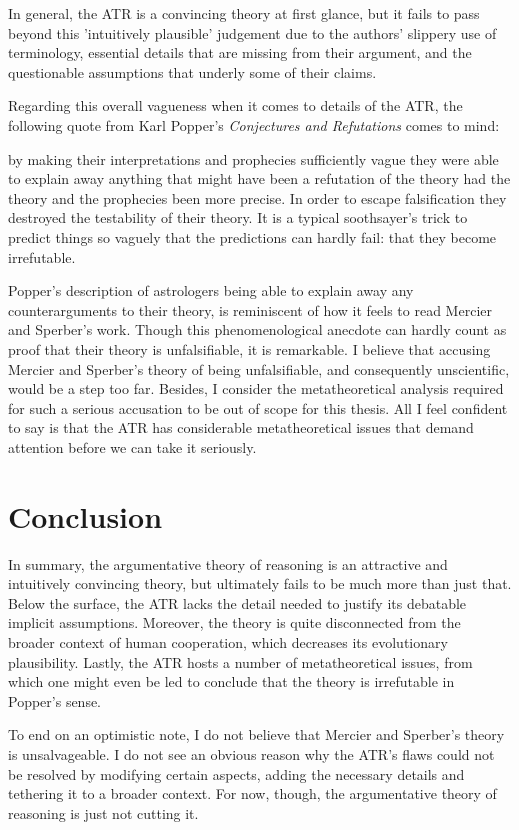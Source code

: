 In general, the ATR is a convincing theory at first glance, but it fails to pass beyond this 'intuitively plausible' judgement due to the authors' slippery use of terminology, essential details that are missing from their argument, and the questionable assumptions that underly some of their claims.

Regarding this overall vagueness when it comes to details of the ATR, the following quote from Karl Popper's \emph{Conjectures and Refutations} comes to mind:
\begin{quoting}
    by making their interpretations and prophecies sufficiently vague they were able to explain away anything that might have been a refutation of the theory had the theory and the prophecies been more precise. In order to escape falsification they destroyed the testability of their theory. It is a typical soothsayer's trick to predict things so vaguely that the predictions can hardly fail: that they become irrefutable.
    \hfill \citep[p.~37]{Popper62}
\end{quoting}
Popper's description of astrologers being able to explain away any counterarguments to their theory, is reminiscent of how it feels to read Mercier and Sperber's work. Though this phenomenological anecdote can hardly count as proof that their theory is unfalsifiable, it is remarkable.
I believe that accusing Mercier and Sperber's theory of being unfalsifiable, and consequently unscientific, would be a step too far. Besides, I consider the metatheoretical analysis required for such a serious accusation to be out of scope for this thesis. All I feel confident to say is that the ATR has considerable metatheoretical issues that demand attention before we can take it seriously.

\section{Conclusion}

In summary, the argumentative theory of reasoning is an attractive and intuitively convincing theory, but ultimately fails to be much more than just that. Below the surface, the ATR lacks the detail needed to justify its debatable implicit assumptions. Moreover, the theory is quite disconnected from the broader context of human cooperation, which decreases its evolutionary plausibility. Lastly, the ATR hosts a number of metatheoretical issues, from which one might even be led to conclude that the theory is irrefutable in Popper's sense.

To end on an optimistic note, I do not believe that Mercier and Sperber's theory is unsalvageable. I do not see an obvious reason why the ATR's flaws could not be resolved by modifying certain aspects, adding the necessary details and tethering it to a broader context. For now, though, the argumentative theory of reasoning is just not cutting it.

